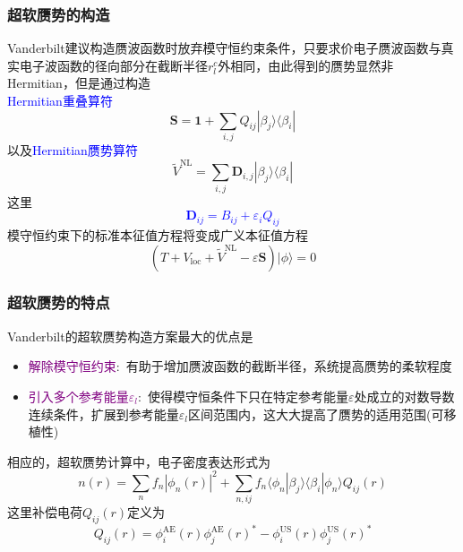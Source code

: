 \frame
{
\frametitle{超软赝势的构造}
\textrm{Vanderbilt}建议构造赝波函数时放弃模守恒约束条件，只要求价电子赝波函数与真实电子波函数的径向部分在截断半径$r_{l}^c$外相同，由此得到的赝势显然非\textrm{Hermitian}，但是通过构造\\\textcolor{blue}{\textrm{Hermitian}重叠算符}
\begin{displaymath}
	\mathbf{S}=\mathbf{1}+\sum_{i,j}Q_{ij}|\beta_j\rangle\langle\beta_i|
\end{displaymath}
以及\textcolor{blue}{\textrm{Hermitian}赝势算符}
\begin{displaymath}
	\tilde V^{\mathrm{NL}}=\sum_{i,j}\mathbf{D}_{i,j}|\beta_j\rangle\langle\beta_i|
\end{displaymath}
这里\textcolor{blue}{
\begin{displaymath}
	\mathbf{D}_{ij}=B_{ij}+\varepsilon_iQ_{ij}
\end{displaymath}}
模守恒约束下的标准本征值方程将变成广义本征值方程
\begin{displaymath}
	(T+V_{\mathrm{loc}}+\tilde V^{\mathrm{NL}}-\varepsilon\mathbf{S})|\phi\rangle=0
\end{displaymath}
}

\frame
{
\frametitle{超软赝势的特点}
\textrm{Vanderbilt}的超软赝势构造方案最大的优点是
\begin{itemize}
	\item \textcolor{purple}{解除模守恒约束}:~有助于增加赝波函数的截断半径，系统提高赝势的柔软程度
	\item \textcolor{purple}{引入多个参考能量$\varepsilon_l$}:~使得模守恒条件下只在特定参考能量$\varepsilon$处成立的对数导数连续条件，扩展到参考能量$\varepsilon_l$区间范围内，这大大提高了赝势的适用范围(可移植性)
\end{itemize}

相应的，超软赝势计算中，电子密度表达形式为
\begin{displaymath}
	n(r)=\sum_nf_n|\phi_n(r)|^2+\sum_{n,ij}f_n\langle\phi_n|\beta_j\rangle\langle\beta_i|\phi_n\rangle Q_{ij}(r)
\end{displaymath}
这里补偿电荷$Q_{ij}(r)$定义为
\begin{displaymath}
	Q_{ij}(r)=\phi_i^{\mathrm{AE}}(r)\phi_j^{\mathrm{AE}}(r)^{\ast}-\phi_i^{\mathrm{US}}(r)\phi_j^{\mathrm{US}}(r)^{\ast}
\end{displaymath}
}

